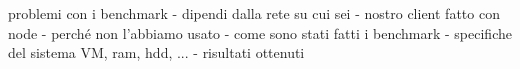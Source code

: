 problemi con i benchmark
- dipendi dalla rete su cui sei
- nostro client fatto con node - perché non l'abbiamo usato
- come sono stati fatti i benchmark
- specifiche del sistema VM, ram, hdd, ...
- risultati ottenuti